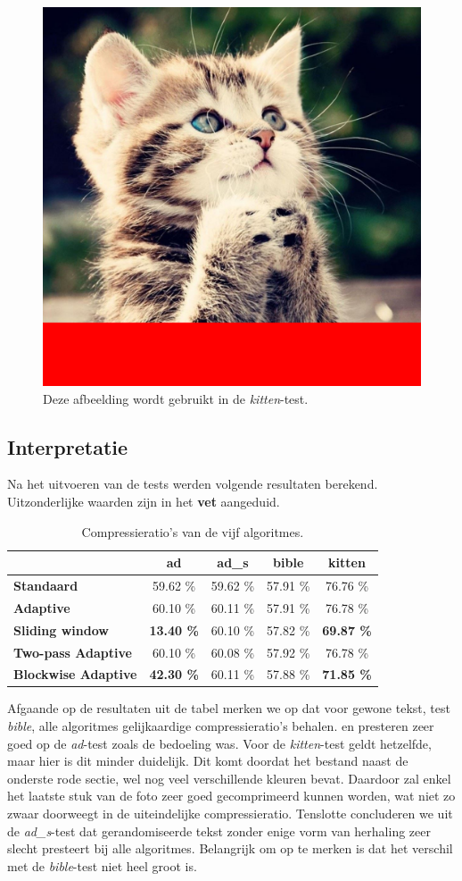 \begin{figure}[h]
	\centering
	\includegraphics[width=0.3\linewidth]{resources/ratio-kitten.png}
	\caption{Deze afbeelding wordt gebruikt in de \emph{kitten}-test. \cite{cutekitten}}
\end{figure}

\subsection{Interpretatie}
Na het uitvoeren van de tests werden volgende resultaten berekend. Uitzonderlijke waarden zijn in het \textbf{vet} aangeduid.
\begin{table}[h]
	\centering
	\begin{tabular}{|l||c|c|c|c|}
		\hline
		& \textbf{ad} & \textbf{ad\_s} & \textbf{bible} & \textbf{kitten}\\\hline
		\textbf{Standaard} & 59.62 \% & 59.62 \% & 57.91 \% & 76.76 \%\\
		\textbf{Adaptive} & 60.10 \% & 60.11 \% & 57.91 \% & 76.78 \%\\		
		\textbf{Sliding window} & \textbf{13.40 \%} & 60.10 \% & 57.82 \% & \textbf{69.87 \%}\\
		\textbf{Two-pass Adaptive} & 60.10 \% & 60.08 \% & 57.92 \% & 76.78 \%\\
		\textbf{Blockwise Adaptive} & \textbf{42.30 \%} & 60.11 \% & 57.88 \% & \textbf{71.85 \%}\\
		\hline
	\end{tabular}
	\caption{Compressieratio's van de vijf algoritmes.}
\end{table}
Afgaande op de resultaten uit de tabel merken we op dat voor gewone tekst, test \emph{bible}, alle algoritmes gelijkaardige compressieratio's behalen. \huffslid en \huffblock presteren zeer goed op de \emph{ad}-test zoals de bedoeling was. Voor de \emph{kitten}-test geldt hetzelfde, maar hier is dit minder duidelijk. Dit komt doordat het bestand naast de onderste rode sectie, wel nog veel verschillende kleuren bevat. Daardoor zal enkel het laatste stuk van de foto zeer goed gecomprimeerd kunnen worden, wat niet zo zwaar doorweegt in de uiteindelijke compressieratio. Tenslotte concluderen we uit de \emph{ad\_s}-test dat gerandomiseerde tekst zonder enige vorm van herhaling zeer slecht presteert bij alle algoritmes. Belangrijk om op te merken is dat het verschil met de \emph{bible}-test niet heel groot is.

